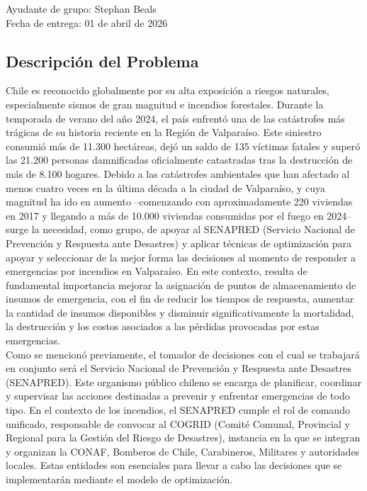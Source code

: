 \documentclass[letterpaper]{article}
\begin{document}
\vspace*{5mm}
{\large Ayudante de grupo: Stephan Beals\\}
{\large Fecha de entrega: 01 de abril de 2026\\}


\newpage
\begin{flushleft}
\tableofcontents
\end{flushleft}

\newpage
\begin{flushleft}
\end{flushleft}

\begin{flushleft}
\section{Descripci\'on del Problema}

Chile es reconocido globalmente por su alta exposici\'on a riesgos naturales, especialmente sismos de gran magnitud e incendios forestales. Durante la temporada de verano del a\~no 2024, el pa\'is enfrent\'o una de las cat\'astrofes m\'as tr\'agicas de su historia reciente en la Regi\'on de Valpara\'iso. Este siniestro consumi\'o m\'as de 11.300 hect\'areas, dej\'o un saldo de 135 v\'ictimas fatales y super\'o las 21.200 personas damnificadas oficialmente catastradas tras la destrucci\'on de m\'as de 8.100 hogares. Debido a las cat\'astrofes ambientales que han afectado al menos cuatro veces en la \'ultima d\'ecada a la ciudad de Valpara\'iso, y cuya magnitud ha ido en aumento --comenzando con aproximadamente 220 viviendas en 2017 y llegando a m\'as de 10.000 viviendas consumidas por el fuego en 2024-- surge la necesidad, como grupo, de apoyar al SENAPRED (Servicio Nacional de Prevenci\'on y Respuesta ante Desastres) y aplicar t\'ecnicas de optimizaci\'on para apoyar y seleccionar de la mejor forma las decisiones al momento de responder a emergencias por incendios en Valpara\'iso. En este contexto, resulta de fundamental importancia mejorar la asignaci\'on de puntos de almacenamiento de insumos de emergencia, con el fin de reducir los tiempos de respuesta, aumentar la cantidad de insumos disponibles y disminuir significativamente la mortalidad, la destrucci\'on y los costos asociados a las p\'erdidas provocadas por estas emergencias.\\

Como se mencion\'o previamente, el tomador de decisiones con el cual se trabajar\'a en conjunto ser\'a el Servicio Nacional de Prevenci\'on y Respuesta ante Desastres (SENAPRED). Este organismo p\'ublico chileno se encarga de planificar, coordinar y supervisar las acciones destinadas a prevenir y enfrentar emergencias de todo tipo. En el contexto de los incendios, el SENAPRED cumple el rol de comando unificado, responsable de convocar al COGRID (Comit\'e Comunal, Provincial y Regional para la Gesti\'on del Riesgo de Desastres), instancia en la que se integran y organizan la CONAF, Bomberos de Chile, Carabineros, Militares y autoridades locales. Estas entidades son esenciales para llevar a cabo las decisiones que se implementar\'an mediante el modelo de optimizaci\'on.\\


\end{flushleft}
\end{document}
